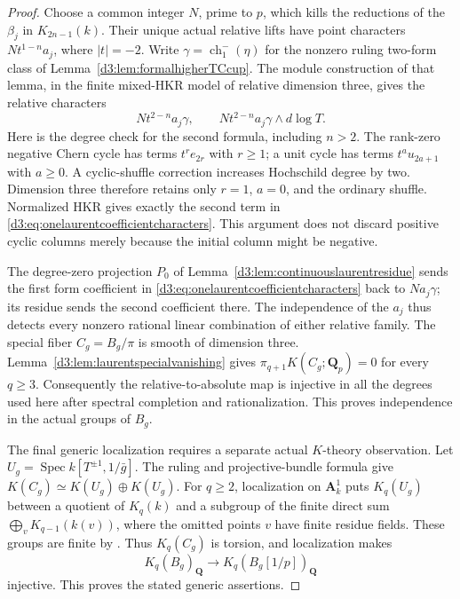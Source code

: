 \documentclass[11pt,a4paper]{amsart}
\numberwithin{equation}{section}
\theoremstyle{definition}
\theoremstyle{remark}
\newcommand{\Q}{\mathbf Q}
\newcommand{\A}{\mathbf A}
\newcommand{\Spec}{\operatorname{Spec}}
\begin{document}
\begin{proof}
Choose a common integer $N$, prime to $p$, which kills the
reductions of the $\beta_j$ in $K_{2n-1}(k)$.
Their unique actual relative lifts have point characters
$Nt^{1-n}a_j$, where $|t|=-2$.
Write $\gamma=\operatorname{ch}^-_1(\eta)$ for the nonzero ruling
two-form class of Lemma~\ref{d3:lem:formalhigherTCcup}.
The module construction of that lemma, in the finite mixed-HKR
model of relative dimension three, gives the relative characters
\begin{equation}\label{d3:eq:onelaurentcoefficientcharacters}
 Nt^{2-n}a_j\gamma,\qquad
 Nt^{2-n}a_j\gamma\wedge d\log T.
\end{equation}
Here is the degree check for the second formula, including $n>2$.
The rank-zero negative Chern cycle has terms $t^r e_{2r}$ with
$r\geq1$; a unit cycle has terms $t^a u_{2a+1}$ with $a\geq0$.
A cyclic-shuffle correction increases Hochschild degree by two.
Dimension three therefore retains only $r=1$, $a=0$, and the
ordinary shuffle. Normalized HKR gives exactly the second term
in \eqref{d3:eq:onelaurentcoefficientcharacters}.
This argument does not discard positive cyclic columns
merely because the initial column might be negative.

The degree-zero projection $P_0$ of
Lemma~\ref{d3:lem:continuouslaurentresidue} sends the first form
coefficient in \eqref{d3:eq:onelaurentcoefficientcharacters}
back to $Na_j\gamma$; its residue sends the second coefficient there.
The independence of the $a_j$ thus detects every nonzero rational
linear combination of either relative family.
The special fiber $C_g=B_g/\pi$ is smooth of dimension three.
Lemma~\ref{d3:lem:laurentspecialvanishing} gives
$\pi_{q+1}K(C_g;\Q_p)=0$ for every $q\geq3$.
Consequently the relative-to-absolute map is injective in all the
degrees used here after spectral completion and rationalization.
This proves independence in the actual groups of $B_g$.

The final generic localization requires a separate actual
$K$-theory observation. Let
$U_g=\Spec k[T^{\pm1},1/\bar g]$.
The ruling and projective-bundle formula give
$K(C_g)\simeq K(U_g)\oplus K(U_g)$.
For $q\geq2$, localization on $\A^1_k$
\cite[Sections~5--7]{Quillen} puts $K_q(U_g)$ between
a quotient of $K_q(k)$ and a subgroup of the finite direct sum
$\bigoplus_vK_{q-1}(k(v))$, where the omitted points $v$ have
finite residue fields. These groups are finite by
\cite{QuillenFinite}\cite[IV, Corollary~1.13]{Weibel}.
Thus $K_q(C_g)$ is torsion, and localization makes
\[
 K_q(B_g)_{\Q}\longrightarrow K_q(B_g[1/p])_{\Q}
\]
injective. This proves the stated generic assertions.
\end{proof}
\end{document}
